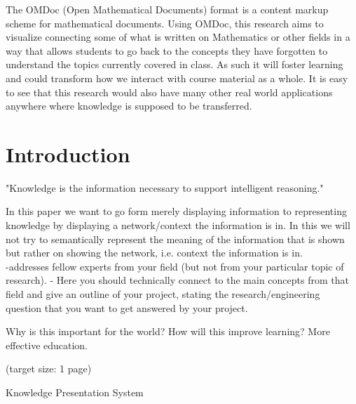\documentclass[twoside]{article}
\newcommand{\sys}{Knowledge Presentation System}
\begin{document}
The OMDoc (Open Mathematical Documents) format is a content markup scheme for mathematical documents.\cite{OMDoc book} Using OMDoc, this research aims to visualize connecting some of what is written on Mathematics or other fields in a way that allows students to go back to the concepts they have forgotten to understand the topics currently covered in class. As such it will foster learning and could transform how we interact with course material as a whole. It is easy to see that this research would also have many other real world applications anywhere where knowledge is supposed to be transferred.\\ 

  \newpage
  \tableofcontents

  \clearpage

  \section{Introduction}




"Knowledge is the information necessary to support intelligent reasoning." \cite{Kohlhase}

In this paper we want to go form merely displaying information to representing knowledge by displaying a network/context the information is in. In this we will not try to semantically represent the meaning of the information that is shown but rather on showing the network, i.e. context the information is in.\cite{Probst} \\

-addresses fellow experts from your field (but not from your particular topic of research). 
- Here you should technically connect to the main concepts from that field and give an outline of your project, stating the research/engineering question that you want to get answered by your project.

Why is this important for the world?
How will this improve learning?
More effective education. 

(target size: 1 page)

\sys

\end{document}
